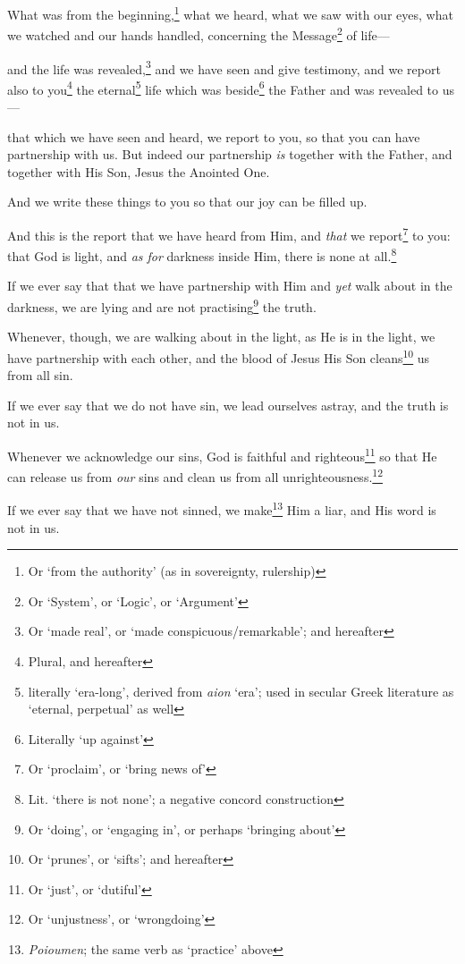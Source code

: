 \documentclass[article]{memoir}%
\newcounter{vnum}
\renewcommand*{\chapter}{
	\vspace{\baselineskip}
	\settowidth{\chapindent}{\chapnumfont 999}
	\noindent\llap{\makebox[\chapindent][l]{%
		\chapnumfont \thechapter}}%
	\addtocounter{chapter}{1}
	\setcounter{vnum}{1}
}
\newcommand{\vnum}{%
	\textsuperscript{\thevnum}%
	\addtocounter{vnum}{1}%
}
\newcommand{\infer}[1]{\textit{#1}}
\newcommand{\focus}[1]{{#1}}
\newcommand{\lxx}[2]{\textit{#1} `#2'}
\renewcommand*{\book}[1]{%
	\makebox[\textwidth][c]{\centering \booktitlefont #1}%
	\setcounter{chapter}{1}
}
\begin{document}
\book{1 John}
	
\chapter{} \vnum What was from the beginning,\footnote{Or ‘from the authority’ (as in sovereignty, rulership)} what we heard, what we saw with our eyes, what we watched and our hands handled, concerning the Message\footnote{Or ‘System’, or ‘Logic’, or ‘Argument’} of life---\vnum and the life was revealed,\footnote{Or `made real', or `made conspicuous/remarkable'; and hereafter} and we have seen and give testimony, and we report also to you\footnote{Plural, and hereafter} the eternal\footnote{literally `era-long', derived from \lxx{aion}{era}; used in secular Greek literature as `eternal, perpetual' as well} life which was beside\footnote{Literally ‘up against’} the Father and was revealed to us---\vnum that which we have seen and heard, we report to you, so that you can have partnership with us. But indeed our partnership \infer{is} together with the Father, and together with His Son, Jesus the Anointed One. \vnum And we write these things to you so that our joy can be filled up.

\vnum And \focus{this} is the report that we have heard from Him, and \infer{that} we report\footnote{Or `proclaim', or `bring news of'} to you: that God is light, and \infer{as for} darkness inside Him, there is none at all.\footnote{Lit. `there is not none'; a negative concord construction} \vnum If we ever say that that we have partnership with Him and \infer{yet} walk about in the darkness, we are lying and are not practising\footnote{Or `doing', or `engaging in', or perhaps `bringing about'} the truth. \vnum Whenever, though, we are walking about in the light, as He is in the light, we have partnership with each other, and the blood of Jesus His Son cleans\footnote{Or `prunes', or `sifts'; and hereafter} us from all sin. \vnum If we ever say that we do not have sin, we lead ourselves astray, and the truth is not in us. \vnum Whenever we acknowledge our sins, God is faithful and righteous\footnote{Or `just', or `dutiful'} so that He can release us from \infer{our} sins and clean us from all unrighteousness.\footnote{Or `unjustness', or `wrongdoing'} \vnum If we ever say that we have not sinned, we make\footnote{\textit{Poioumen}; the same verb as `practice' above} Him a liar, and His word is not in us.
\end{document}
